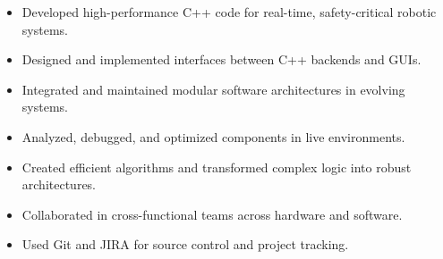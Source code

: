 \documentclass[10pt,a4paper,ragged2e,withhyper]{altacv}
\begin{document}
\begin{paracol}{2}
	\begin{itemize}
		\item Developed high-performance C++ code for real-time, safety-critical robotic systems.
		\item Designed and implemented interfaces between C++ backends and GUIs.
		\item Integrated and maintained modular software architectures in evolving systems.
		\item Analyzed, debugged, and optimized components in live environments.
		\item Created efficient algorithms and transformed complex logic into robust architectures.
		\item Collaborated in cross-functional teams across hardware and software.
		\item Used Git and JIRA for source control and project tracking.
	\end{itemize}




	\switchcolumn


	
	

	{\LaTeXraggedright
		\par}


\end{paracol}
\end{document}
